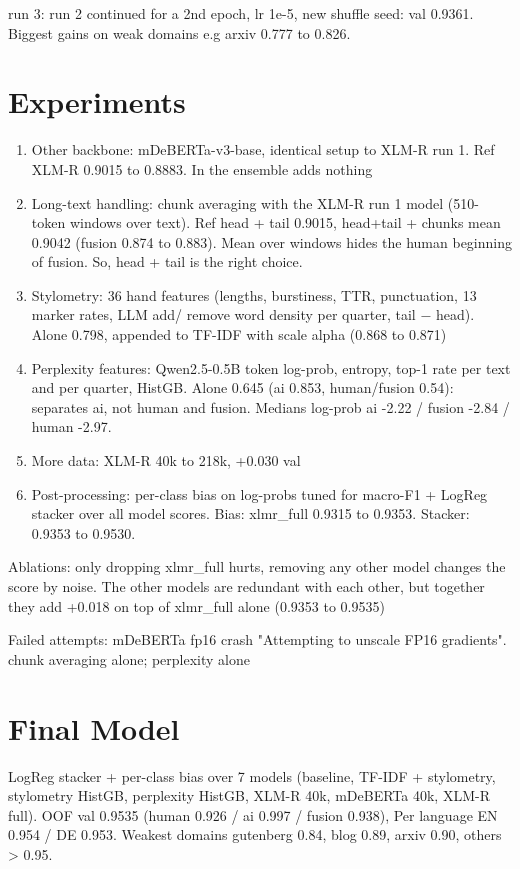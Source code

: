 \documentclass[10pt,a4paper]{article}
\begin{document}
\noindent run 3: run 2 continued for a 2nd epoch, lr 1e-5, new shuffle seed: val 0.9361. Biggest gains on weak domains e.g arxiv 0.777 to 0.826.



\section{Experiments}

\begin{enumerate}
  \item Other backbone: mDeBERTa-v3-base, identical setup to XLM-R run 1. Ref XLM-R 0.9015 to 0.8883. In
  the ensemble adds nothing
  \item Long-text handling: chunk averaging with the XLM-R run 1 model (510-token windows over text). Ref 
  head + tail 0.9015, head+tail + chunks mean 0.9042 (fusion 0.874 to 0.883). Mean over
  windows hides the human beginning of fusion. So, head + tail is the right choice.
  \item Stylometry: 36 hand features (lengths, burstiness, TTR, punctuation, 13 marker rates, LLM add/
  remove word density per quarter, tail $-$ head). Alone 0.798, appended to TF-IDF with scale alpha (0.868 to 0.871)
  \item Perplexity features: Qwen2.5-0.5B token log-prob, entropy, top-1 rate per text and per quarter, HistGB. 
  Alone 0.645 (ai 0.853, human/fusion 0.54): separates ai, not human and fusion. Medians log-prob ai -2.22 / 
  fusion -2.84 / human -2.97.
  \item More data: XLM-R 40k to 218k, +0.030 val
  \item Post-processing: per-class bias on log-probs tuned for macro-F1 + LogReg stacker over all model scores. 
  Bias: xlmr\_full 0.9315 to 0.9353. Stacker: 0.9353 to 0.9530.
\end{enumerate}

\noindent Ablations: only dropping xlmr\_full hurts, removing any other model changes the score by noise. The other 
models are redundant with each other, but together they add +0.018 on top of xlmr\_full alone (0.9353 to 0.9535)

\noindent Failed attempts: mDeBERTa fp16 crash "Attempting to unscale FP16 gradients". chunk averaging alone; perplexity alone

\section{Final Model}
LogReg stacker + per-class bias over 7 models (baseline, TF-IDF + stylometry, stylometry HistGB, perplexity HistGB, XLM-R 40k, mDeBERTa 40k, XLM-R full). OOF val 0.9535 (human 0.926 / ai 0.997 / fusion 0.938), 
Per language EN 0.954 / DE 0.953. Weakest domains gutenberg 0.84, blog 0.89, arxiv 0.90, others > 0.95.
\end{document}
